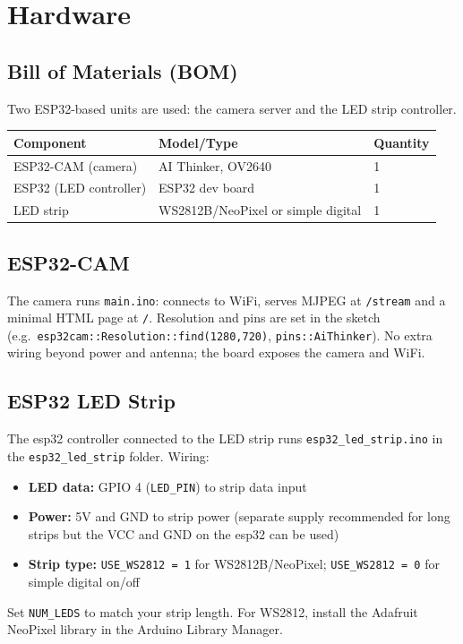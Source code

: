\documentclass[a4paper,12pt]{article}
\begin{document}
\section{Hardware}

\subsection{Bill of Materials (BOM)}
Two ESP32-based units are used: the camera server and the LED strip controller.

\begin{center}
\begin{tabular}{@{}lll@{}}
\toprule
\textbf{Component} & \textbf{Model/Type} & \textbf{Quantity} \\ \midrule
ESP32-CAM (camera) & AI Thinker, OV2640   & 1 \\ \midrule
ESP32 (LED controller) & ESP32 dev board     & 1 \\
LED strip            & WS2812B/NeoPixel or simple digital & 1 \\\bottomrule
\end{tabular}
\end{center}

\subsection{ESP32-CAM}
The camera runs \texttt{main.ino}: connects to WiFi, serves MJPEG at \texttt{/stream} and a minimal HTML page at \texttt{/}. Resolution and pins are set in the sketch (e.g.\ \texttt{esp32cam::Resolution::find(1280,720)}, \texttt{pins::AiThinker}). No extra wiring beyond power and antenna; the board exposes the camera and WiFi.

\subsection{ESP32 LED Strip}
The esp32 controller connected to the LED strip runs \texttt{esp32\_led\_strip.ino} in the \texttt{esp32\_led\_strip} folder. Wiring:
\begin{itemize}
    \item \textbf{LED data:} GPIO 4 (\texttt{LED\_PIN}) to strip data input
    \item \textbf{Power:} 5V and GND to strip power (separate supply recommended for long strips but the VCC and GND on the esp32 can be used)
    \item \textbf{Strip type:} \texttt{USE\_WS2812 = 1} for WS2812B/NeoPixel; \texttt{USE\_WS2812 = 0} for simple digital on/off
\end{itemize}
Set \texttt{NUM\_LEDS} to match your strip length. For WS2812, install the Adafruit NeoPixel library in the Arduino Library Manager.
\end{document}
